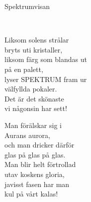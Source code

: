 \begin{song}{Spektrumvisan}
	
	
	\\
	
	Liksom solens strålar\\
	bryts uti kristaller,\\
	liksom färg som blandas ut\\
	på en palett,\\
	lyser SPEKTRUM fram ur\\
	välfyllda pokaler.\\
	Det är det skönaste\\
	vi någonsin har sett!
	
	Man förälskar sig i\\
	Aurans aurora,\\
	och man dricker därför\\
	glas på glas på glas.\\
	Man blir helt förtrollad\\
	utav koskens gloria,\\
	javisst fasen har man\\
	kul på vårt kalas!
	
\end{song}
